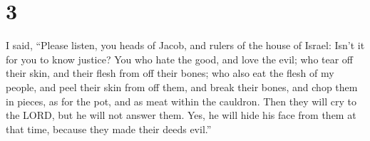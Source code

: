 \hypertarget{section-1}{%
\section{3}\label{section-1}}

 I said, ``Please listen, you heads of Jacob, and rulers of
the house of Israel: Isn't it for you to know justice?  You
who hate the good, and love the evil; who tear off their skin, and their
flesh from off their bones;  who also eat the flesh of my
people, and peel their skin from off them, and break their bones, and
chop them in pieces, as for the pot, and as meat within the cauldron.
 Then they will cry to the LORD, but he will not answer
them. Yes, he will hide his face from them at that time, because they
made their deeds evil.''

